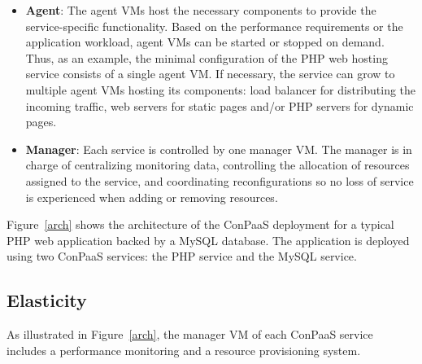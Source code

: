 \begin{itemize}
\item \textbf{Agent}: The agent VMs host the necessary components to provide the service-specific functionality. Based on the performance requirements or the application workload, agent VMs can be started or stopped on demand. Thus, as an example, the minimal configuration of the PHP web hosting service consists of a single agent VM. If necessary,
the service can grow to multiple agent VMs hosting its
components: load balancer for distributing the incoming traffic, web
servers for static pages and/or PHP servers for dynamic pages.
\item \textbf{Manager}: Each service is controlled by one manager VM. The manager is in charge of centralizing monitoring data, controlling the allocation of resources assigned to the service, and coordinating reconfigurations so no loss of service is experienced when adding or removing resources.
\end{itemize}

Figure~\ref{arch} shows the architecture of the ConPaaS deployment for
a typical PHP web application backed by a MySQL database. The
application is deployed using two ConPaaS services: the PHP service
and the MySQL service.


\subsection*{Elasticity}

As illustrated in Figure~\ref{arch}, the manager VM of each ConPaaS
service includes a performance monitoring and a resource provisioning
system.

